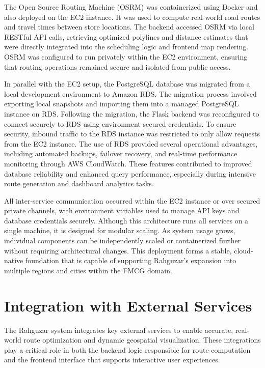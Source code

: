 The Open Source Routing Machine (OSRM) was containerized using Docker and also deployed on the EC2 instance. It was used to compute real-world road routes and travel times between store locations. The backend accessed OSRM via local RESTful API calls, retrieving optimized polylines and distance estimates that were directly integrated into the scheduling logic and frontend map rendering. OSRM was configured to run privately within the EC2 environment, ensuring that routing operations remained secure and isolated from public access.

In parallel with the EC2 setup, the PostgreSQL database was migrated from a local development environment to Amazon RDS. The migration process involved exporting local snapshots and importing them into a managed PostgreSQL instance on RDS. Following the migration, the Flask backend was reconfigured to connect securely to RDS using environment-secured credentials. To ensure security, inbound traffic to the RDS instance was restricted to only allow requests from the EC2 instance. The use of RDS provided several operational advantages, including automated backups, failover recovery, and real-time performance monitoring through AWS CloudWatch. These features contributed to improved database reliability and enhanced query performance, especially during intensive route generation and dashboard analytics tasks.

All inter-service communication occurred within the EC2 instance or over secured private channels, with environment variables used to manage API keys and database credentials securely. Although this architecture runs all services on a single machine, it is designed for modular scaling. As system usage grows, individual components can be independently scaled or containerized further without requiring architectural changes. This deployment forms a stable, cloud-native foundation that is capable of supporting Rahguzar’s expansion into multiple regions and cities within the FMCG domain.

\section{Integration with External Services}

The Rahguzar system integrates key external services to enable accurate, real-world route optimization and dynamic geospatial visualization. These integrations play a critical role in both the backend logic responsible for route computation and the frontend interface that supports interactive user experiences.

